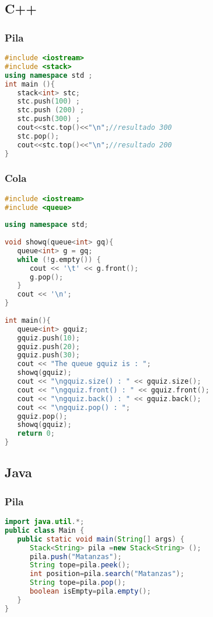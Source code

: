 \subsection{C++}

\subsubsection{Pila}
\begin{lstlisting}[language=C++]
#include <iostream>
#include <stack>
using namespace std ;
int main (){
   stack<int> stc;
   stc.push(100) ;
   stc.push (200) ;
   stc.push(300) ;
   cout<<stc.top()<<"\n";//resultado 300
   stc.pop();
   cout<<stc.top()<<"\n";//resultado 200
}
\end{lstlisting}

\subsubsection{Cola}

\begin{lstlisting}[language=C++]
#include <iostream>
#include <queue>
	
using namespace std;
	
void showq(queue<int> gq){
   queue<int> g = gq;
   while (!g.empty()) {
      cout << '\t' << g.front();
      g.pop();
   }
   cout << '\n';
}
	
int main(){
   queue<int> gquiz;
   gquiz.push(10);
   gquiz.push(20);
   gquiz.push(30);
   cout << "The queue gquiz is : ";
   showq(gquiz);
   cout << "\ngquiz.size() : " << gquiz.size();
   cout << "\ngquiz.front() : " << gquiz.front();
   cout << "\ngquiz.back() : " << gquiz.back();
   cout << "\ngquiz.pop() : ";
   gquiz.pop();
   showq(gquiz);
   return 0;
}
\end{lstlisting}

\subsection{Java}

\subsubsection{Pila}
\begin{lstlisting}[language=Java]
import java.util.*;
public class Main {
   public static void main(String[] args) {
      Stack<String> pila =new Stack<String> ();
      pila.push("Matanzas");
      String tope=pila.peek();
      int position=pila.search("Matanzas");
      String tope=pila.pop();
      boolean isEmpty=pila.empty();
   }
}
\end{lstlisting}

